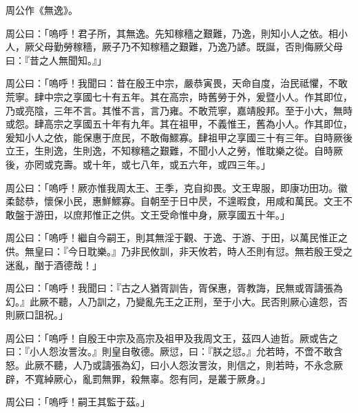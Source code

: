 
\begin{pinyinscope}
周公作《無逸》。

周公曰：「嗚呼！君子所，其無逸。先知稼穡之艱難，乃逸，則知小人之依。相小人，厥父母勤勞稼穡，厥子乃不知稼穡之艱難，乃逸乃諺。既誕，否則侮厥父母曰：『昔之人無聞知。』」

周公曰：「嗚呼！我聞曰：昔在殷王中宗，嚴恭寅畏，天命自度，治民祗懼，不敢荒寧。肆中宗之享國七十有五年。其在高宗，時舊勞于外，爰暨小人。作其即位，乃或亮陰，三年不言。其惟不言，言乃雍。不敢荒寧，嘉靖殷邦。至于小大，無時或怨。肆高宗之享國五十年有九年。其在祖甲，不義惟王，舊為小人。作其即位，爰知小人之依，能保惠于庶民，不敢侮鰥寡。肆祖甲之享國三十有三年。自時厥後立王，生則逸，生則逸，不知稼穡之艱難，不聞小人之勞，惟耽樂之從。自時厥後，亦罔或克壽。或十年，或七八年，或五六年，或四三年。」

周公曰：「嗚呼！厥亦惟我周太王、王季，克自抑畏。文王卑服，即康功田功。徽柔懿恭，懷保小民，惠鮮鰥寡。自朝至于日中昃，不遑暇食，用咸和萬民。文王不敢盤于游田，以庶邦惟正之供。文王受命惟中身，厥享國五十年。」

周公曰：「嗚呼！繼自今嗣王，則其無淫于觀、于逸、于游、于田，以萬民惟正之供。無皇曰：『今日耽樂。』乃非民攸訓，非天攸若，時人丕則有愆。無若殷王受之迷亂，酗于酒德哉！」

周公曰：「嗚呼！我聞曰：『古之人猶胥訓告，胥保惠，胥教誨，民無或胥譸張為幻。』此厥不聽，人乃訓之，乃變亂先王之正刑，至于小大。民否則厥心違怨，否則厥口詛祝。」

周公曰：「嗚呼！自殷王中宗及高宗及祖甲及我周文王，茲四人迪哲。厥或告之曰：『小人怨汝詈汝。』則皇自敬德。厥愆，曰：『朕之愆。』允若時，不啻不敢含怒。此厥不聽，人乃或譸張為幻，曰小人怨汝詈汝，則信之，則若時，不永念厥辟，不寬綽厥心，亂罰無罪，殺無辜。怨有同，是叢于厥身。」

周公曰：「嗚呼！嗣王其監于茲。」


\end{pinyinscope}